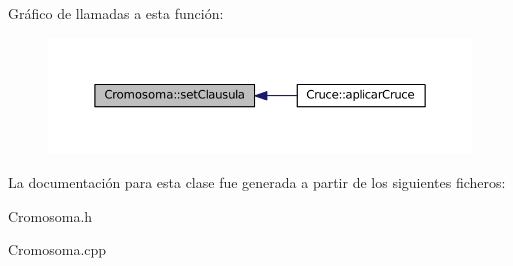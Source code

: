 Gráfico de llamadas a esta función\-:\nopagebreak
\begin{figure}[H]
\begin{center}
\leavevmode
\includegraphics[width=350pt]{classCromosoma_a826283527e3bdefe28a7ba7fc84dc965_icgraph}
\end{center}
\end{figure}




La documentación para esta clase fue generada a partir de los siguientes ficheros\-:\begin{DoxyCompactItemize}
\item 
Cromosoma.\-h\item 
Cromosoma.\-cpp\end{DoxyCompactItemize}
